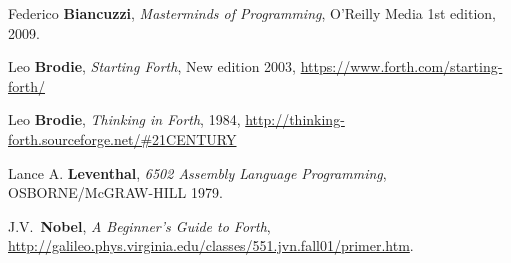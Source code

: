 \begin{thebibliography}{99}

        Federico \textbf{Biancuzzi},
  	\textit{Masterminds of Programming},
	O'Reilly Media
  	1st edition,
	2009.

        Leo \textbf{Brodie},
  	\textit{Starting Forth},
  	New edition 2003,
        \href{https://www.forth.com/starting-forth/}{https://www.forth.com/starting-forth/}

        Leo \textbf{Brodie},
  	\textit{Thinking in Forth},
  	1984,
        \href{http://thinking-forth.sourceforge.net/\#21CENTURY}{http://thinking-forth.sourceforge.net/\#21CENTURY}

        Lance A. \textbf{Leventhal},
  	\textit{6502 Assembly Language Programming},
	OSBORNE/McGRAW-HILL
	1979.

        J.V.~\textbf{Nobel},
  	\textit{A Beginner's Guide to Forth},
        \href{http://galileo.phys.virginia.edu/classes/551.jvn.fall01/primer.htm}{http://galileo.phys.virginia.edu/classes/551.jvn.fall01/primer.htm}.

\end{thebibliography}

